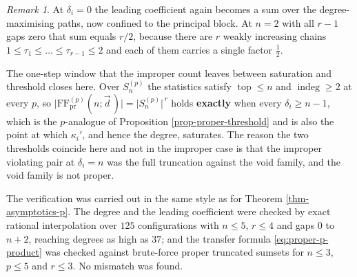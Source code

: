\documentclass[11pt, a4paper, abstract=yes]{scrartcl}
\theoremstyle{definition}
\theoremstyle{remark}
\newtheorem{remark}[definition]{Remark}
\theoremstyle{plain}
\newcommand{\indeg}{\operatorname{indeg}}
\newcommand{\tp}{\operatorname{top}}
\begin{document}
\begin{remark}
At \(\delta_i=0\) the leading coefficient again becomes a sum over the degree-maximising paths,
now confined to the principal block. At \(n=2\) with all \(r-1\) gaps zero that sum equals
\(r/2\), because there are \(r\) weakly increasing chains
\(1\le\tau_1\le\dots\le\tau_{r-1}\le2\) and each of them carries a single factor
\(\tfrac12\).

The one-step window that the improper count leaves between saturation and threshold closes here.
Over \(S_n^{(p)}\) the statistics satisfy \(\tp\le n\) and \(\indeg\ge2\) at every \(p\), so
\(\lvert\mathrm{FF}^{(p)}_{\mathrm{pr}}(n;\vec d\,)\rvert=\lvert S_n^{(p)}\rvert^{\,r}\) holds \textbf{exactly}
when every \(\delta_i\ge n-1\), which is the \(p\)-analogue of
Proposition \ref{prop-proper-threshold} and is also the point at which \(\kappa_i'\), and hence the
degree, saturates. The reason the two thresholds coincide here and not in the improper case is that
the improper violating pair at \(\delta_i=n\) was the full truncation against the void family,
and the void family is not proper.

The verification was carried out in the same style as for Theorem \ref{thm-asymptotics-p}. The degree
and the leading coefficient were checked by exact rational interpolation over \(125\)
configurations with \(n\le5\), \(r\le4\) and gaps \(0\) to \(n+2\), reaching degrees as high
as \(37\); and the transfer formula \eqref{eq:proper-p-product} was checked against brute-force
proper truncated sumsets for \(n\le3\), \(p\le5\) and \(r\le3\). No mismatch was found.
\label{rem-proper-p}
\end{remark}
\end{document}

